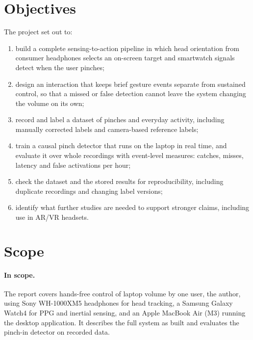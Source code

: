 \section{Objectives}

The project set out to:
\begin{enumerate}
\item build a complete sensing-to-action pipeline in which head orientation from consumer headphones selects an on-screen target and smartwatch signals detect when the user pinches;
\item design an interaction that keeps brief gesture events separate from sustained control, so that a missed or false detection cannot leave the system changing the volume on its own;
\item record and label a dataset of pinches and everyday activity, including manually corrected labels and camera-based reference labels;
\item train a causal pinch detector that runs on the laptop in real time, and evaluate it over whole recordings with event-level measures: catches, misses, latency and false activations per hour;
\item check the dataset and the stored results for reproducibility, including duplicate recordings and changing label versions;
\item identify what further studies are needed to support stronger claims, including use in AR/VR headsets.
\end{enumerate}

\section{Scope}

\paragraph{In scope.} The report covers hands-free control of laptop volume by one user, the author, using Sony WH-1000XM5 headphones for head tracking, a Samsung Galaxy Watch4 for PPG and inertial sensing, and an Apple MacBook Air (M3) running the desktop application. It describes the full system as built and evaluates the pinch-in detector on recorded data.

